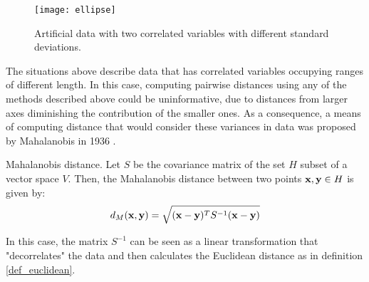 \documentclass[../main.tex]{subfiles}
\begin{document}
\begin{figure}[t]
\centering
\texttt{[image: ellipse]}
\caption{Artificial data with two correlated variables with different standard deviations.}
\label{fig_ellipse}
\end{figure}
\par The situations above describe data that has correlated variables occupying ranges of different length. In this case, computing pairwise distances using any of the methods described above could be uninformative, due to distances from larger axes diminishing the contribution of the smaller ones. As a consequence, a means of computing distance that would consider these variances in data was proposed by Mahalanobis in 1936 \cite{Bellet2013}.

\begin{definition}{Mahalanobis distance.} \label{def_mahalanobis}
Let $S$ be the covariance matrix of the set $H$ subset of a vector space $V$. Then, the Mahalanobis distance between two points $\mathbf{x,y}\in H$ is given by:
\begin{align*}
d_{M}(\mathbf{x}, \mathbf{y}) = \sqrt{(\mathbf{x}-\mathbf{y})^TS^{-1}(\mathbf{x}-\mathbf{y})}
\end{align*}
\end{definition}

\par In this case, the matrix $S^{-1}$ can be seen as a linear transformation that "decorrelates" the data and then calculates the Euclidean distance as in definition \ref{def_euclidean}. 
\end{document}
